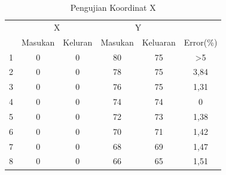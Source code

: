 \begin{longtable}{|c|c|c|c|c|c|}
	\caption{Pengujian Koordinat X}
	\label{tbl.y}\\
	\hline
	\rowcolor[HTML]{9B9B9B} 
	\cellcolor[HTML]{9B9B9B}                     & \multicolumn{2}{c|}{\cellcolor[HTML]{9B9B9B}X} & \multicolumn{2}{c|}{\cellcolor[HTML]{9B9B9B}Y} & \cellcolor[HTML]{9B9B9B}                           \\ \cline{2-5}
	\rowcolor[HTML]{9B9B9B} 
	\multirow{-2}{*}{\cellcolor[HTML]{9B9B9B}No} & Masukan                & Keluran               & Masukan               & Keluaran               & \multirow{-2}{*}{\cellcolor[HTML]{9B9B9B}Error(\%)} \\ \hline
		\endfirsthead
		\endhead
		1                                            & 0                      & 0                     & 80                    & 75                     & >5                                               \\ \hline
		2                                            & 0                      & 0                     & 78                    & 75                     & 3,84                                       \\ \hline
		3                                            & 0                      & 0                     & 76                    & 75                     & 1,31                                       \\ \hline
		4                                            & 0                      & 0                     & 74                    & 74                     & 0                                                  \\ \hline
		5                                            & 0                      & 0                     & 72                    & 73                     & 1,38                                     \\ \hline
		6                                            & 0                      & 0                     & 70                    & 71                     & 1,42                                       \\ \hline
		7                                            & 0                      & 0                     & 68                    & 69                     & 1,47                                       \\ \hline
		8                                            & 0                      & 0                     & 66                    & 65                     & 1,51                                        \\ \hline

\end{longtable}
